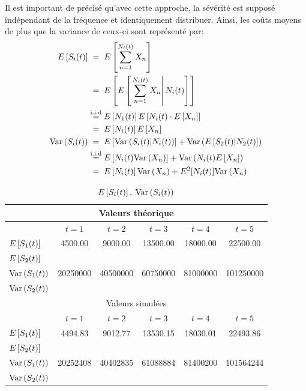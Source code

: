 \documentclass[12pt, french]{report}
\begin{document}
Il est important de précisé qu'avec cette approche, la sévérité est supposé indépendant de la fréquence et 
identiquement distribuer. Ainsi, les coûts moyens de plus que la variance de ceux-ci sont représenté par: 
\begin{align}
    \esp{S_i(t)} &\overset{\hphantom{\text{i.i.d}}}{=} \esp{\sum_{n=1}^{N_i(t)} X_n } \nonumber \\
                 &\overset{\hphantom{\text{i.i.d}}}{=} \esp{\esp{\left. \sum_{n=1}^{N_i(t)} X_n \right| N_i(t)}} \nonumber \\
                 &\overset{\text{i.i.d}}{=} \esp{N_1(t)} \esp{N_i(t) \cdot \esp{X_n}} \nonumber \\
                 & \overset{\hphantom{\text{i.i.d}}}{=} \esp{N_i(t)} \esp{X_n} \\
    \var{S_i(t)} &\overset{\hphantom{\text{i.i.d}}}{=} \esp{\var{S_i(t)|N_i(t)}} + \var{\esp{S_2(t)|N_2(t)}} \nonumber \\
                 &\overset{\text{i.i.d}}{=} \esp{N_i(t) \var{X_n}} + \var{N_i(t) \esp{X_n}} \nonumber \\
                 &\overset{\hphantom{\text{i.i.d}}}{=} \esp{N_i(t)} \var{X_n} + E^2[N_i(t)] \var{X_n} 
\end{align}

\begin{table}[ht]
    \centering
    \caption{$E \left[ S_i(t) \right],\: \text{Var} \left( S_i(t) \right)$}
    \begin{tabular}{|lccccc|}
        \hline
        \multicolumn{6}{|c|}{Valeurs théorique} \\
        \hline
        & $t=1$ & $t=2$ & $t=3$ & $t=4$ & $t=5$ \\
        \hline
        $E \left[ S_1(t) \right]$ & 4500.00 & 9000.00 & 13500.00 & 18000.00 & 22500.00 \\
        $E \left[ S_2(t) \right]$ &&&&& \\  
        $\text{Var} \left( S_1(t) \right)$ & 20250000 & 40500000 & 60750000 & 81000000 & 101250000 \\
        $\text{Var} \left( S_2(t) \right)$ &&&&& \\
        \hline
        \hline
        \multicolumn{6}{|c|}{Valeurs simulées} \\
        \hline
        & $t=1$ & $t=2$ & $t=3$ & $t=4$ & $t=5$ \\
        \hline
        $E \left[ S_1(t) \right]$ & 4494.83 & 9012.77 & 13530.15 & 18030.01 & 22493.86 \\
        $E \left[ S_2(t) \right]$ &&&&& \\  
        $\text{Var} \left( S_1(t) \right)$ & 20252408 & 40402835 & 61088884 & 81400200 & 101564244 \\
        $\text{Var} \left( S_2(t) \right)$ &&&&& \\
        \hline
    \end{tabular}
\end{table}
\end{document}
